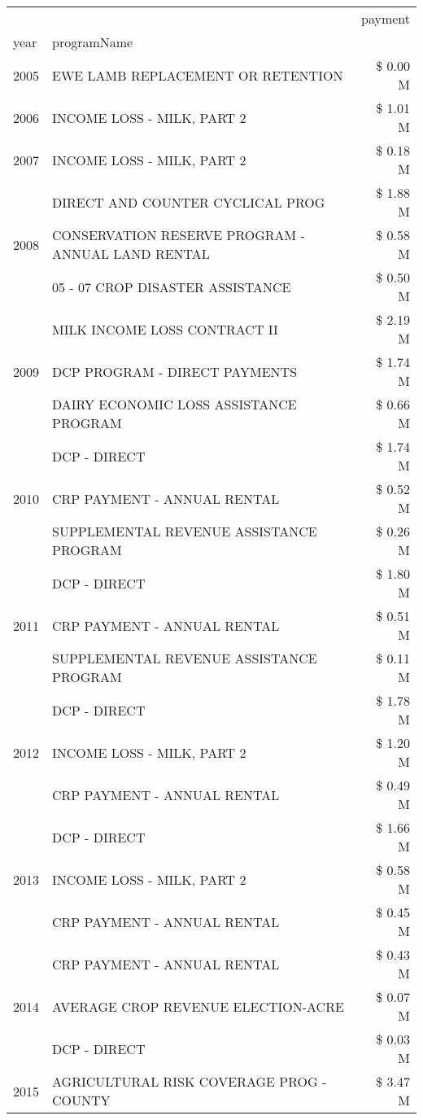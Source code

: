 \begin{tabular}{llr}
\toprule
 &  & payment \\
year & programName &  \\
\midrule
2005 & EWE LAMB REPLACEMENT OR RETENTION & \$ 0.00 M \\
\cline{1-3}
2006 & INCOME LOSS - MILK, PART 2 & \$ 1.01 M \\
\cline{1-3}
2007 & INCOME LOSS - MILK, PART 2 & \$ 0.18 M \\
\cline{1-3}
\multirow[t]{3}{*}{2008} & DIRECT AND COUNTER CYCLICAL PROG & \$ 1.88 M \\
 & CONSERVATION RESERVE PROGRAM - ANNUAL LAND RENTAL & \$ 0.58 M \\
 & 05 - 07 CROP DISASTER ASSISTANCE & \$ 0.50 M \\
\cline{1-3}
\multirow[t]{3}{*}{2009} & MILK INCOME LOSS CONTRACT II & \$ 2.19 M \\
 & DCP PROGRAM - DIRECT PAYMENTS & \$ 1.74 M \\
 & DAIRY ECONOMIC LOSS ASSISTANCE PROGRAM & \$ 0.66 M \\
\cline{1-3}
\multirow[t]{3}{*}{2010} & DCP - DIRECT & \$ 1.74 M \\
 & CRP PAYMENT - ANNUAL RENTAL & \$ 0.52 M \\
 & SUPPLEMENTAL REVENUE ASSISTANCE PROGRAM & \$ 0.26 M \\
\cline{1-3}
\multirow[t]{3}{*}{2011} & DCP - DIRECT & \$ 1.80 M \\
 & CRP PAYMENT - ANNUAL RENTAL & \$ 0.51 M \\
 & SUPPLEMENTAL REVENUE ASSISTANCE PROGRAM & \$ 0.11 M \\
\cline{1-3}
\multirow[t]{3}{*}{2012} & DCP - DIRECT & \$ 1.78 M \\
 & INCOME LOSS - MILK, PART 2 & \$ 1.20 M \\
 & CRP PAYMENT - ANNUAL RENTAL & \$ 0.49 M \\
\cline{1-3}
\multirow[t]{3}{*}{2013} & DCP - DIRECT & \$ 1.66 M \\
 & INCOME LOSS - MILK, PART 2 & \$ 0.58 M \\
 & CRP PAYMENT - ANNUAL RENTAL & \$ 0.45 M \\
\cline{1-3}
\multirow[t]{3}{*}{2014} & CRP PAYMENT - ANNUAL RENTAL & \$ 0.43 M \\
 & AVERAGE CROP REVENUE ELECTION-ACRE & \$ 0.07 M \\
 & DCP - DIRECT & \$ 0.03 M \\
\cline{1-3}
\multirow[t]{3}{*}{2015} & AGRICULTURAL RISK COVERAGE PROG - COUNTY & \$ 3.47 M \\

\end{tabular}
